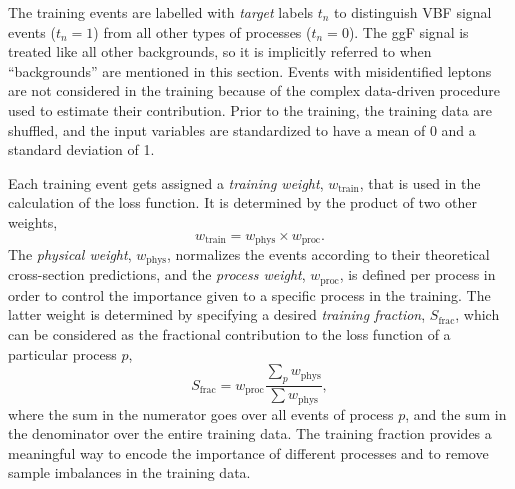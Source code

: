 The training events are labelled with \emph{target} labels $t_n$ to distinguish VBF signal events ($t_n = 1$) from all other types of processes ($t_n = 0$).
The ggF signal is treated like all other backgrounds, so it is implicitly referred to when ``backgrounds'' are mentioned in this section.
Events with misidentified leptons are not considered in the training because of the complex data-driven procedure used to estimate their contribution.
Prior to the training, the training data are shuffled, and the input variables are standardized to have a mean of 0 and a standard deviation of 1.

Each training event gets assigned a \emph{training weight}, $w_\text{train}$, that is used in the calculation of the loss function. It is determined by the product of two other weights,
\begin{equation}
    w_\text{train} = w_\text{phys} \times w_\text{proc}.
\end{equation}
The \emph{physical weight}, $w_\text{phys}$, normalizes the events according to their theoretical cross-section predictions, and the \emph{process weight}, $w_\text{proc}$, is defined per process in order to control the importance given to a specific process in the training.
The latter weight is determined by specifying a desired \emph{training fraction}, $S_\text{frac}$, which can be considered as the fractional contribution to the loss function of a particular process $p$,
\begin{equation}
    S_\text{frac} = w_\text{proc} \frac{\sum_{p} w_\text{phys}}{ \sum w_\text{phys}},
\end{equation}
where the sum in the numerator goes over all events of process $p$, and the sum in the denominator over the entire training data. The training fraction provides a meaningful way to encode the importance of different processes and to remove sample imbalances in the training data. 

